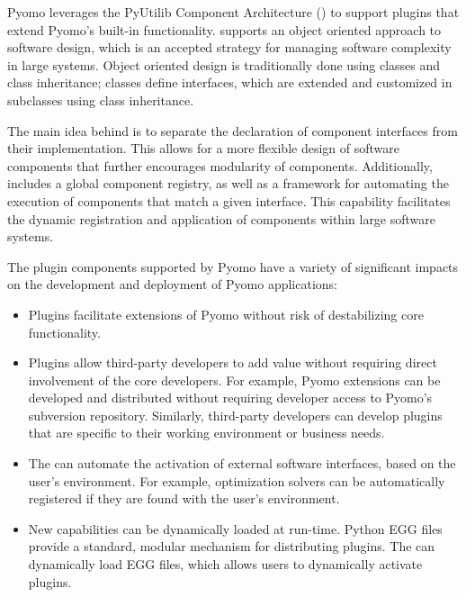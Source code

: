 


Pyomo leverages the PyUtilib Component Architecture (\pca) to support
plugins that extend Pyomo's built-in functionality.  \pcasp supports an
object oriented approach to software design, which is an accepted strategy
for managing software complexity in large systems.  Object oriented
design is traditionally done using classes and class inheritance;  classes
define interfaces, which are extended and customized in subclasses using
class inheritance.

The main idea behind \pcasp is to separate the declaration of component
interfaces from their implementation.  This allows for a more flexible
design of software components that further encourages modularity of
components.  Additionally, \pcasp includes a global component registry, as
well as a framework for automating the execution of components that match
a given interface.  This capability facilitates the dynamic registration
and application of components within large software systems.

The plugin components supported by Pyomo have a variety of significant impacts
on the development and deployment of Pyomo applications:
\begin{itemize}

\item Plugins facilitate extensions of Pyomo without risk of destabilizing core functionality.  

\item Plugins allow third-party developers to add value without requiring direct involvement of the core developers.  For example, Pyomo extensions can be developed and distributed without requiring developer access to Pyomo's subversion repository.  Similarly, third-party developers can develop 
plugins that are specific to their working environment or business needs.

\item The \pcasp can automate the activation of external software interfaces, based on the user's environment.  For example, optimization solvers can be
automatically registered if they are found with the user's  environment.

\item New capabilities can be dynamically loaded at run-time.  Python EGG files provide a standard, modular mechanism for distributing plugins.  The \pcasp can dynamically load EGG files, which allows users to dynamically activate 
plugins.

\end{itemize}


